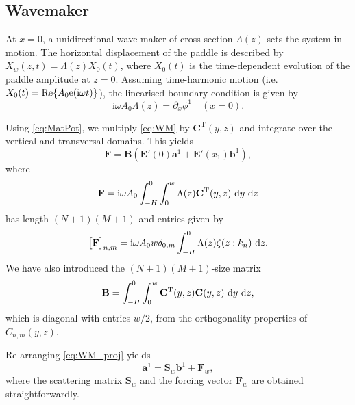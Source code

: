 \documentclass[12pt,a4paper]{article}
\newcommand{\real}{\textrm{Re}}
\newcommand{\wrt}{ ~ {\rm d}}
\def\ci{{\mathrm i}}
\renewcommand{\exp}{{\rm e}}
\newcommand{\ie}{i.e.\ }
\newcommand{\vp}{{\phi}}
\newcommand{\vm}{{\zeta}}
\begin{document}
\subsection{Wavemaker}

At $x=0$, a unidirectional wave maker of cross-section $\Lambda(z)$ sets the system in motion. The 
horizontal displacement of the paddle is described by $X_w(z,t)=\Lambda(z)X_0(t)$, where $X_0(t)$ is the 
time-dependent evolution of the paddle amplitude at $z = 0$. Assuming time-harmonic motion (\ie 
$X_0(t) = \real\{A_0\exp(\ci\omega t)\}$), the linearised 
boundary condition is given by
\begin{equation}
  \label{eq:WM}
  \ci \omega A_0 \Lambda(z) = \partial_x \vp^1 \quad (x=0).
\end{equation}

Using \eqref{eq:MatPot}, we multiply \eqref{eq:WM} by $\mathbf{C}^{\mathrm{T}}(y,z)$ and integrate over the 
vertical and transversal domains. This yields
\begin{equation}
  \label{eq:WM_proj}
  \mathbf{F} = \mathbf{B}\left(\mathbf{E}'(0)\mathbf{a}^1 + \mathbf{E}'(x_1)\mathbf{b}^1\right),
\end{equation}
where
\[
  \mathbf{F} = \ci \omega A_0 \int_{-H}^0 \int_0^w \Lambda(z) \mathbf{C}^{\mathrm{T}}(y,z) \wrt y \wrt z
\]
has length $(N+1)(M+1)$ and entries given by 
\[
  \big[\mathbf{F}\big]_{n,m} = \ci \omega A_0 w \delta_{0,m} \int_{-H}^0 \Lambda(z) \vm(z:k_{n}) \wrt z.
\]
We have also introduced the $(N+1)(M+1)$-size matrix
\[
  \mathbf{B} = \int_{-H}^0 \int_0^w \mathbf{C}^{\mathrm{T}}(y,z) \mathbf{C}(y,z) \wrt y \wrt z,
\]
which is diagonal with entries $w/2$, from the orthogonality properties of $C_{n,m}(y,z)$.

Re-arranging \eqref{eq:WM_proj} yields 
\begin{equation}
  \mathbf{a}^1 = \mathbf{S}_w\mathbf{b}^1 + \mathbf{F}_w,
\end{equation}
where the scattering matrix $\mathbf{S}_w$ and the forcing vector $\mathbf{F}_w$ are obtained 
straightforwardly.









% 


%
\end{document}
